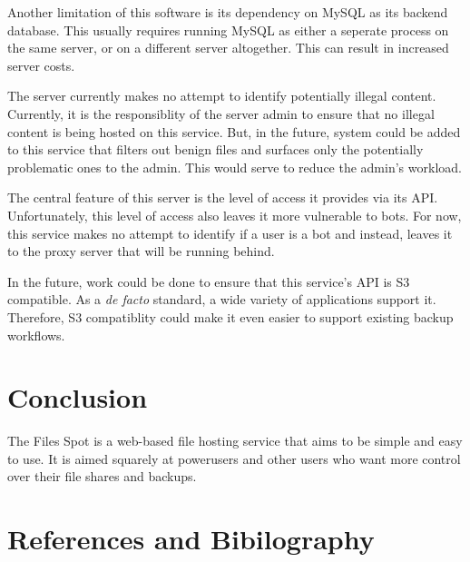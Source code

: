 \documentclass[12pt,a4paper]{report}
\begin{document}
Another limitation of this software is its dependency on MySQL as its backend database.
This usually requires running MySQL as either a seperate process on the same server, or on a different server altogether.
This can result in increased server costs.

The server currently makes no attempt to identify potentially illegal content.
Currently, it is the responsiblity of the server admin to ensure that no illegal content is being hosted on this service.
But, in the future, system could be added to this service that filters out benign files and surfaces only the potentially problematic ones to the admin.
This would serve to reduce the admin's workload.

The central feature of this server is the level of access it provides via its API.
Unfortunately, this level of access also leaves it more vulnerable to bots.
For now, this service makes no attempt to identify if a user is a bot and instead, leaves it to the proxy server that will be running behind.

In the future, work could be done to ensure that this service's API is S3 compatible.
As a \textit{de facto} standard, a wide variety of applications support it.
Therefore, S3 compatiblity could make it even easier to support existing backup workflows.
\newpage
\chapter{Conclusion}\label{cha:conclusion}
The Files Spot is a web-based file hosting service that aims to be simple and easy to use.
It is aimed squarely at powerusers and other users who want more control over their file shares and backups.
\newpage
\chapter{References and Bibilography}\label{cha:references_and_bibilography}
\end{document}
